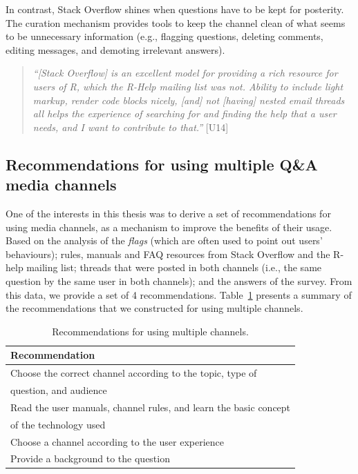 \documentclass{sig-alternate-05-2015}
\begin{document}
	In contrast, Stack Overflow shines when questions have to be kept for posterity. 
	The curation mechanism provides tools to keep the channel clean of what seems to be unnecessary information (e.g., flagging questions, deleting comments, editing messages, and demoting irrelevant answers).

    \begin{quote}
        \textit{``[Stack Overflow] is an excellent model for providing a rich resource for users of R, which the R-Help mailing list was not. 
        Ability to include light markup, render code blocks nicely, [and] not [having] nested email threads all helps the experience of searching for and finding the help that a user needs, and I want to contribute to that.''} [U14]
	\end{quote}

\subsection{Recommendations for using multiple Q\&A media channels}

	One of the interests in this thesis was to derive a set of recommendations for using media channels, as a mechanism to improve the benefits of their usage.
	Based on the analysis of the \textit{flags} (which are often used to point out users' behaviours); rules, manuals and FAQ resources from Stack Overflow and the R-help mailing list; threads that were posted in both channels (i.e., the same question by the same user in both channels); and the answers of the survey.
	From this data, we provide a set of 4 recommendations.
	Table~\ref{table:recomendations} presents a summary of the recommendations that we constructed for using multiple channels.

    \begin{table}[!htb]
      \centering
	  \caption{Recommendations for using multiple channels.}
	  \label{table:recomendations}
	  \begin{tabular}{@{}l@{}}
        \toprule
        \textbf{Recommendation}\\
        \midrule
			Choose the correct channel according to the topic, type of\\
		    \hspace{3em}question, and audience \\
			Read the user manuals, channel rules, and learn the basic concept\\
			\hspace{3em}of the technology used \\
			Choose a channel according to the user experience \\
			Provide a background to the question \\
        \bottomrule
	  \end{tabular}
	\end{table}
\end{document}
